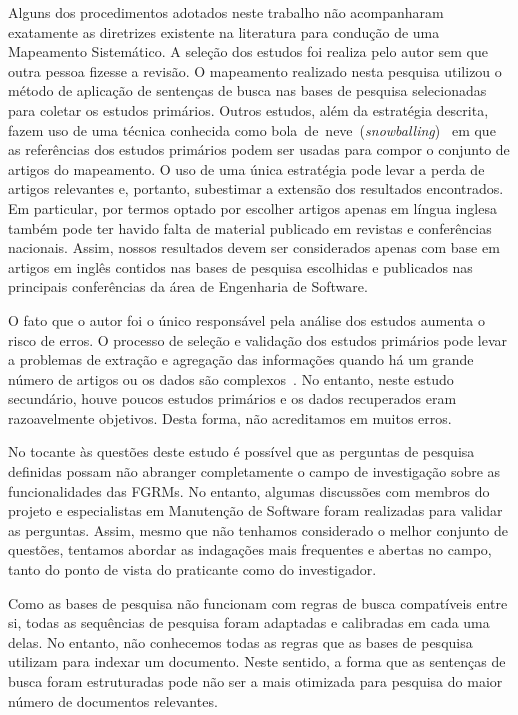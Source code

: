 Alguns dos procedimentos adotados neste trabalho não acompanharam exatamente as
diretrizes existente na literatura para condução de uma Mapeamento Sistemático.
A seleção dos estudos foi realiza pelo autor sem que outra pessoa fizesse a
revisão. O mapeamento realizado nesta pesquisa utilizou o método de aplicação
de sentenças de busca nas bases de pesquisa selecionadas para coletar os
estudos primários. Outros estudos, além da estratégia descrita, fazem uso de
uma técnica conhecida como
bola~de~neve~(\textit{snowballing})~\cite{wohlin2014guidelines} em que as
referências dos estudos primários podem ser usadas para compor o conjunto de
artigos do mapeamento. O uso de uma única estratégia pode levar a perda de
artigos relevantes e, portanto, subestimar a extensão dos resultados
encontrados. Em particular, por termos optado por escolher artigos apenas em
língua inglesa também pode ter havido falta de material publicado em revistas e
conferências nacionais. Assim, nossos resultados devem ser considerados apenas
com base em artigos em inglês contidos nas bases de pesquisa escolhidas e
publicados nas principais conferências da área de Engenharia de Software.

O fato que o autor foi o único responsável pela análise dos estudos aumenta o
risco de erros. O processo de seleção e validação dos estudos primários pode
levar a problemas de extração e agregação das informações quando há um grande
número de artigos ou os dados são complexos~\cite{keele2007guidelines}. No
entanto, neste estudo secundário, houve poucos estudos primários e os dados
recuperados eram razoavelmente objetivos. Desta forma, não acreditamos em
muitos erros.

No tocante às questões deste estudo é possível que as perguntas de pesquisa
definidas possam não abranger completamente o campo de investigação sobre as
funcionalidades das FGRMs. No entanto, algumas discussões com membros do
projeto e especialistas em Manutenção de Software foram realizadas para validar
as perguntas. Assim, mesmo que não tenhamos considerado o melhor conjunto de
questões, tentamos abordar as indagações mais frequentes e abertas no campo,
tanto do ponto de vista do praticante como do investigador.

Como as bases de pesquisa não funcionam com regras de busca compatíveis entre
si, todas as sequências de pesquisa foram adaptadas e calibradas em cada uma
delas. No entanto, não conhecemos todas as regras que as bases de pesquisa
utilizam para indexar um documento. Neste sentido, a forma que as sentenças de
busca foram estruturadas pode não ser a mais otimizada para pesquisa do maior
número de documentos relevantes.

